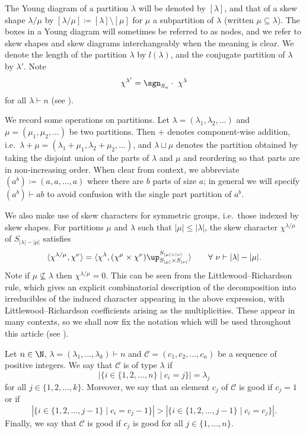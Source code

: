The Young diagram of a partition $\lambda$ will be denoted by $[\lambda]$, and that of a skew shape $\lambda/\mu$ by $[\lambda/\mu]\coloneqq [\lambda]\setminus[\mu]$ for $\mu$ a subpartition of $\lambda$ (written $\mu\subseteq\lambda$). The boxes in a Young diagram will sometimes be referred to as nodes, and we refer to skew shapes and skew diagrams interchangeably when the meaning is clear.
We denote the length of the partition $\lambda$ by $l(\lambda)$, and the conjugate partition of $\lambda$ by $\lambda'$. Note
\begin{equation}\label{eqn:sign}
	\chi^{\lambda'}=\sgn_{S_n}\cdot\ \chi^\lambda
\end{equation}
for all $\lambda\vdash n$ (see \cite[2.1.8]{JK}). 

We record some operations on partitions. Let $\lambda=(\lambda_1,\lambda_2,\dotsc)$ and $\mu=(\mu_1,\mu_2,\dotsc)$ be two partitions. Then $+$ denotes component-wise addition, i.e.~$\lambda+\mu=(\lambda_1+\mu_1,\lambda_2+\mu_2,\dotsc)$, and $\lambda\sqcup\mu$ denotes the partition obtained by taking the disjoint union of the parts of $\lambda$ and $\mu$ and reordering so that parts are in non-increasing order.
When clear from context, we abbreviate $(a^b)\coloneqq (a,a,\dotsc,a)$ where there are $b$ parts of size $a$; in general we will specify $(a^b)\vdash ab$ to avoid confusion with the single part partition of $a^b$.

We also make use of skew characters for symmetric groups, i.e.~those indexed by skew shapes. For partitions $\mu$ and $\lambda$ such that $|\mu|\le|\lambda|$, the skew character $\chi^{\lambda/\mu}$ of $S_{|\lambda|-|\mu|}$ satisfies
\begin{equation}\label{eqn:skew}
	\langle \chi^{\lambda/\mu},\chi^\nu\rangle = \langle \chi^\lambda, (\chi^\mu\times \chi^\nu)\up_{S_{|\mu|}\times S_{|\nu|}}^{S_{|\mu|+|\nu|}}\rangle\qquad\forall\ \nu\vdash |\lambda|-|\mu|.
\end{equation}
Note if $\mu\not\subseteq\lambda$ then $\chi^{\lambda/\mu}=0$. This can be seen from the Littlewood--Richardson rule, which gives an explicit combinatorial description of the decomposition into irreducibles of the induced character appearing in the above expression, with Littlewood--Richardson coefficients arising as the multiplicities. These appear in many contexts, so we shall now fix the notation which will be used throughout this article (see \cite{J}).

\begin{definition}
	Let $n\in\N$, $\lambda=(\lambda_1,\dotsc,\lambda_k)\vdash n$ and $\mathcal{C}=(c_1,c_2,\dotsc,c_n)$ be a sequence of positive integers. We say that $\mathcal{C}$ is of type $\lambda$ if 
	\[ |\{i\in\{1,2,\dotsc,n\} \mid c_i=j\}|=\lambda_j\]
	for all $j\in\{1,2,\dotsc,k\}$. Moreover, we say that an element $c_j$ of $\mathcal{C}$ is good if $c_j=1$ or if
	\[ |\{i\in\{1,2,\dotsc,j-1\}\mid c_i=c_j-1\}| > |\{i\in\{1,2,\dotsc,j-1\}\mid c_i=c_j\}|. \]
	Finally, we say that $\mathcal{C}$ is good if $c_j$ is good for all $j\in\{1,\dotsc,n\}$.
\end{definition}

